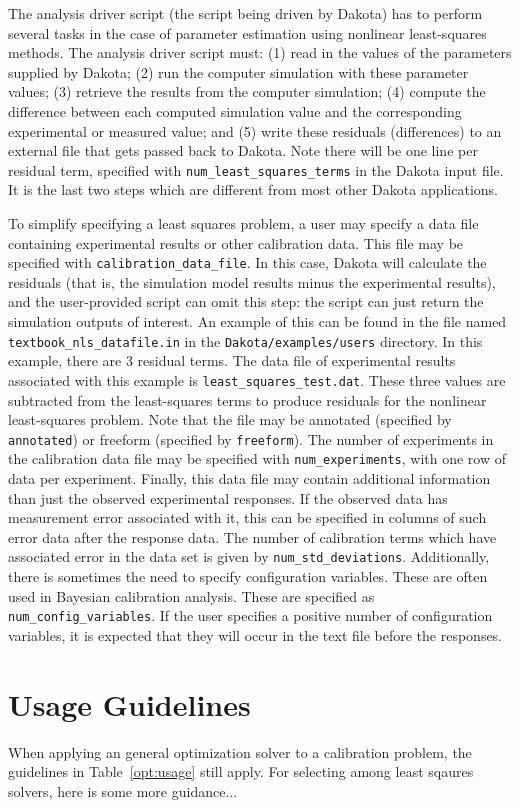 The analysis driver script (the script being driven by Dakota) 
has to perform several tasks in the case of parameter estimation 
using nonlinear least-squares methods.  The analysis driver script 
must: (1) read in the values of the parameters supplied by Dakota;
(2) run the computer simulation with these parameter values;
(3) retrieve the results from the computer simulation;
(4) compute the difference between each computed simulation value
and the corresponding experimental or measured value; and 
(5) write these residuals (differences)
to an external file that gets passed back to Dakota.  Note there 
will be one line per residual term, specified with 
\texttt{num\_least\_squares\_terms}
in the Dakota input file.   It is the last two steps which are different from 
most other Dakota applications.  

To simplify specifying a least squares problem, a user may specify a
data file containing experimental results or other calibration data.
This file may be specified with \texttt{calibration\_data\_file}. 
In this case, Dakota will calculate the residuals (that is, the
simulation model results minus the experimental results), and the
user-provided script can omit this step: the script can just return
the simulation outputs of interest.  An example of this can be found
in the file named \texttt{textbook\_nls\_datafile.in} in the
\texttt{Dakota/examples/users} directory.  In this example, there
are 3 residual terms.  The data file of experimental results
associated with this example is \texttt{least\_squares\_test.dat}.
These three values are subtracted from the least-squares terms to
produce residuals for the nonlinear least-squares problem.
Note that the file may be annotated (specified by \texttt{annotated}) or 
freeform (specified by \texttt{freeform}). The number of experiments in the 
calibration data file may be specified with \texttt{num\_experiments}, 
with one row of data per experiment.
Finally, this data file may contain additional information than just the observed 
experimental responses.  If the observed data has measurement error associated with it, 
this can be specified in columns of such error data after the response data. 
The number of calibration terms which have associated error in the data 
set is given by \texttt{num\_std\_deviations}.  Additionally, there is sometimes the 
need to specify configuration variables.  These are often used in Bayesian calibration 
analysis.  These are specified as \texttt{num\_config\_variables}.  If the user 
specifies a positive number of configuration variables, it is expected that they will 
occur in the text file before the responses. 

\section{Usage Guidelines}\label{nls:usage}


When applying an general optimization solver to a calibration problem,
the guidelines in Table~\ref{opt:usage} still apply.  For selecting
among least sqaures solvers, here is some more guidance...
